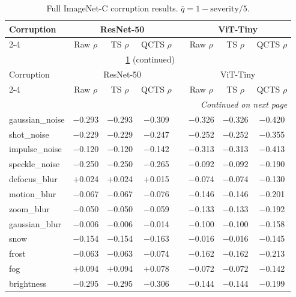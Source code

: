 \documentclass{bmvc2k}
\begin{document}
\begin{longtable}{lccccccc}
\caption{Full ImageNet-C corruption results. $\bar q = 1 - \text{severity}/5$.}
\label{tab:imagenetc_full} \\
\toprule
Corruption & \multicolumn{3}{c}{ResNet-50} & & \multicolumn{3}{c}{ViT-Tiny} \\
\cmidrule{2-4} \cmidrule{6-8}
& Raw $\rho$ & TS $\rho$ & QCTS $\rho$ & & Raw $\rho$ & TS $\rho$ & QCTS $\rho$ \\
\midrule
\endfirsthead
\multicolumn{8}{c}{\tablename\ \ref{tab:imagenetc_full} (continued)} \\
\toprule
Corruption & \multicolumn{3}{c}{ResNet-50} & & \multicolumn{3}{c}{ViT-Tiny} \\
\cmidrule{2-4} \cmidrule{6-8}
& Raw $\rho$ & TS $\rho$ & QCTS $\rho$ & & Raw $\rho$ & TS $\rho$ & QCTS $\rho$ \\
\midrule
\endhead
\midrule
\multicolumn{8}{r}{\textit{Continued on next page}} \\
\endfoot
\bottomrule
\endlastfoot
gaussian\_noise    & $-$0.293 & $-$0.293 & $-$0.309 & & $-$0.326 & $-$0.326 & $-$0.420 \\
shot\_noise        & $-$0.229 & $-$0.229 & $-$0.247 & & $-$0.252 & $-$0.252 & $-$0.355 \\
impulse\_noise     & $-$0.120 & $-$0.120 & $-$0.142 & & $-$0.313 & $-$0.313 & $-$0.413 \\
speckle\_noise     & $-$0.250 & $-$0.250 & $-$0.265 & & $-$0.092 & $-$0.092 & $-$0.190 \\
defocus\_blur      & $+$0.024 & $+$0.024 & $+$0.015 & & $-$0.074 & $-$0.074 & $-$0.130 \\
motion\_blur       & $-$0.067 & $-$0.067 & $-$0.076 & & $-$0.146 & $-$0.146 & $-$0.201 \\
zoom\_blur         & $-$0.050 & $-$0.050 & $-$0.059 & & $-$0.133 & $-$0.133 & $-$0.192 \\
gaussian\_blur     & $-$0.006 & $-$0.006 & $-$0.014 & & $-$0.100 & $-$0.100 & $-$0.158 \\
snow               & $-$0.154 & $-$0.154 & $-$0.163 & & $-$0.016 & $-$0.016 & $-$0.145 \\
frost              & $-$0.063 & $-$0.063 & $-$0.074 & & $-$0.162 & $-$0.162 & $-$0.213 \\
fog                & $+$0.094 & $+$0.094 & $+$0.078 & & $-$0.072 & $-$0.072 & $-$0.142 \\
brightness         & $-$0.295 & $-$0.295 & $-$0.306 & & $-$0.144 & $-$0.144 & $-$0.199 \\

\end{longtable}
\end{document}
